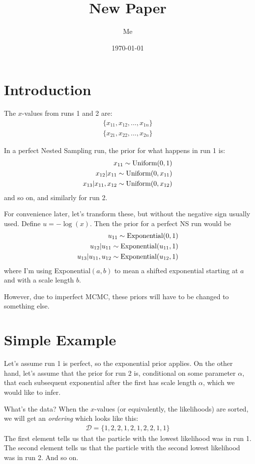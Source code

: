 \documentclass[a4paper, 11pt]{article}
\title{New Paper}
\author{Me}
\date{\today}
\begin{document}
\maketitle


\section{Introduction}
The $x$-values from runs 1 and 2 are:
\begin{eqnarray}
\{x_{11}, x_{12}, ..., x_{1n}\}\\
\{x_{21}, x_{22}, ..., x_{2n}\}
\end{eqnarray}

In a perfect Nested Sampling run, the prior for what happens in run 1 is:
\begin{eqnarray}
x_{11} \sim \textnormal{Uniform}(0, 1)\\
x_{12} | x_{11} \sim \textnormal{Uniform}(0, x_{11})\\
x_{13} | x_{11}, x_{12} \sim \textnormal{Uniform}(0, x_{12})
\end{eqnarray}
and so on, and similarly for run 2.

For convenience later, let's transform these, but without the negative sign
usually used. Define $u=-\log(x)$. Then the prior for a perfect NS run would be
\begin{eqnarray}
u_{11} \sim \textnormal{Exponential}(0, 1)\\
u_{12} | u_{11} \sim \textnormal{Exponential}(u_{11}, 1)\\
u_{13} | u_{11}, u_{12} \sim \textnormal{Exponential}(u_{12}, 1)
\end{eqnarray}
where I'm using Exponential$(a, b)$ to mean a shifted exponential starting
at $a$ and with a scale length $b$.

However, due to imperfect MCMC, these priors will have to be changed to
something else.

\section{Simple Example}
Let's assume run 1 is perfect, so the exponential prior applies. On the other
hand, let's assume that the prior for run 2 is, conditional on some parameter
$\alpha$, that each subsequent exponential after the first has scale
length $\alpha$, which we would like to infer.

What's the data? When the $x$-values (or equivalently, the likelihoods) are
sorted, we will get an {\it ordering} which looks like this:
\begin{eqnarray}
\mathcal{D} = \{1, 2, 2, 1, 2, 1, 2, 2, 1, 1\}
\end{eqnarray}
The first element tells us that the particle with the lowest likelihood was
in run 1. The second element tells us that the particle with the second lowest
likelihood was in run 2. And so on.
\end{document}
